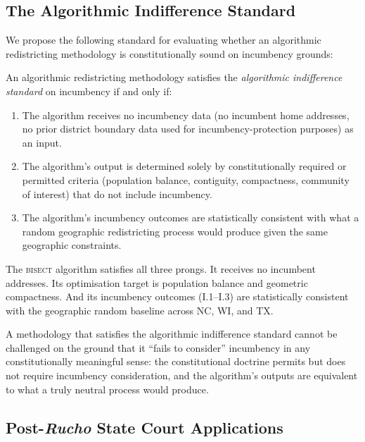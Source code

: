 \label{sec:discussion}

\subsection{The Algorithmic Indifference Standard}

We propose the following standard for evaluating whether an algorithmic redistricting
methodology is constitutionally sound on incumbency grounds:

\begin{definition}
An algorithmic redistricting methodology satisfies the \emph{algorithmic indifference
standard} on incumbency if and only if:
\begin{enumerate}
  \item The algorithm receives no incumbency data (no incumbent home addresses, no
    prior district boundary data used for incumbency-protection purposes) as an input.
  \item The algorithm's output is determined solely by constitutionally required or
    permitted criteria (population balance, contiguity, compactness, community of
    interest) that do not include incumbency.
  \item The algorithm's incumbency outcomes are statistically consistent with what a
    random geographic redistricting process would produce given the same geographic
    constraints.
\end{enumerate}
\end{definition}

The \textsc{bisect} algorithm satisfies all three prongs. It receives no incumbent
addresses. Its optimisation target is population balance and geometric compactness.
And its incumbency outcomes (I.1--I.3) are statistically consistent with the geographic
random baseline across NC, WI, and TX.

A methodology that satisfies the algorithmic indifference standard cannot be challenged
on the ground that it ``fails to consider'' incumbency in any constitutionally meaningful
sense: the constitutional doctrine permits but does not require incumbency consideration,
and the algorithm's outputs are equivalent to what a truly neutral process would produce.

\subsection{Post-\textit{Rucho} State Court Applications}

